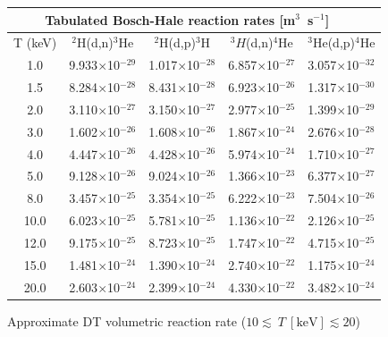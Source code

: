 \noindent
\begin{table}[h!]\small
  \noindent
  \centering
  \begin{tabular}{c c c c c}
    \multicolumn{5}{c}{Tabulated Bosch-Hale reaction rates [m$^3$~s$^{-1}$]~~\cite{bosch}}\\
    \hline
    T (keV) \T\B& $^2$H(d,n)$^3$He & $^2$H(d,p)$^3$H & $^3H$(d,n)$^4$He & $^3$He(d,p)$^4$He\\
    \hline\hline
    1.0\T& 9.933$\times$10$^{-29}$ & 1.017$\times$10$^{-28}$ & 6.857$\times$10$^{-27}$ & 3.057$\times$10$^{-32}$ \\
    1.5  & 8.284$\times$10$^{-28}$ & 8.431$\times$10$^{-28}$ & 6.923$\times$10$^{-26}$ & 1.317$\times$10$^{-30}$ \\
    2.0  & 3.110$\times$10$^{-27}$ & 3.150$\times$10$^{-27}$ & 2.977$\times$10$^{-25}$ & 1.399$\times$10$^{-29}$ \\
    3.0  & 1.602$\times$10$^{-26}$ & 1.608$\times$10$^{-26}$ & 1.867$\times$10$^{-24}$ & 2.676$\times$10$^{-28}$ \\
    4.0  & 4.447$\times$10$^{-26}$ & 4.428$\times$10$^{-26}$ & 5.974$\times$10$^{-24}$ & 1.710$\times$10$^{-27}$ \\
    5.0  & 9.128$\times$10$^{-26}$ & 9.024$\times$10$^{-26}$ & 1.366$\times$10$^{-23}$ & 6.377$\times$10$^{-27}$ \\
    8.0  & 3.457$\times$10$^{-25}$ & 3.354$\times$10$^{-25}$ & 6.222$\times$10$^{-23}$ & 7.504$\times$10$^{-26}$ \\
   10.0  & 6.023$\times$10$^{-25}$ & 5.781$\times$10$^{-25}$ & 1.136$\times$10$^{-22}$ & 2.126$\times$10$^{-25}$ \\
   12.0  & 9.175$\times$10$^{-25}$ & 8.723$\times$10$^{-25}$ & 1.747$\times$10$^{-22}$ & 4.715$\times$10$^{-25}$ \\
   15.0  & 1.481$\times$10$^{-24}$ & 1.390$\times$10$^{-24}$ & 2.740$\times$10$^{-22}$ & 1.175$\times$10$^{-24}$ \\
   20.0\B& 2.603$\times$10$^{-24}$ & 2.399$\times$10$^{-24}$ & 4.330$\times$10$^{-22}$ & 3.482$\times$10$^{-24}$ \\
   \hline
  \end{tabular}
  \label{table:rr}
\end{table}

\noindent
Approximate DT volumetric reaction rate ($10\lesssim~T~\mathrm{[keV]}\lesssim20$) 

